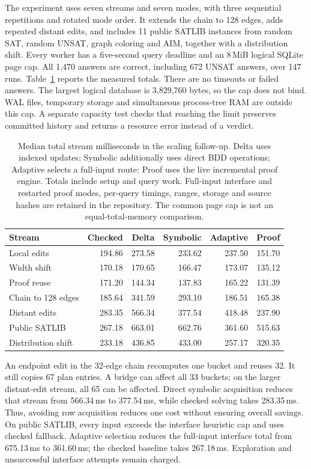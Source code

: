 \documentclass[11pt,a4paper]{article}
\numberwithin{equation}{section}
\theoremstyle{plain}
\theoremstyle{definition}
\theoremstyle{remark}
\begin{document}
The experiment uses seven streams and seven modes, with three sequential repetitions and rotated mode order. It extends the chain to 128 edges, adds repeated distant edits, and includes 11 public SATLIB instances from random SAT, random UNSAT, graph coloring and AIM, together with a distribution shift. Every worker has a five-second query deadline and an 8\,MiB logical SQLite page cap. All 1,470 answers are correct, including 672 UNSAT answers, over 147 runs. Table~\ref{tab:scaling-study} reports the measured totals. There are no timeouts or failed answers. The largest logical database is 3,829,760 bytes, so the cap does not bind. WAL files, temporary storage and simultaneous process-tree RAM are outside this cap. A separate capacity test checks that reaching the limit preserves committed history and returns a resource error instead of a verdict.

\begin{table}[b]
\centering
\small
\setlength{\tabcolsep}{5pt}
\begin{tabular}{lrrrrr}
\toprule
Stream & Checked & Delta & Symbolic & Adaptive & Proof \\
\midrule
Local edits & 194.86 & 273.58 & 233.62 & 237.50 & 151.70 \\
Width shift & 170.18 & 170.65 & 166.47 & 173.07 & 135.12 \\
Proof reuse & 171.20 & 144.34 & 137.83 & 165.22 & 131.39 \\
Chain to 128 edges & 185.64 & 341.59 & 293.10 & 186.51 & 165.38 \\
Distant edits & 283.35 & 566.34 & 377.54 & 418.48 & 237.90 \\
Public SATLIB & 267.18 & 663.01 & 662.76 & 361.60 & 515.63 \\
Distribution shift & 233.18 & 436.85 & 433.00 & 257.17 & 320.35 \\
\bottomrule
\end{tabular}
\caption{Median total stream milliseconds in the scaling follow-up. Delta uses indexed updates; Symbolic additionally uses direct BDD operations; Adaptive selects a full-input route; Proof uses the live incremental proof engine. Totals include setup and query work. Full-input interface and restarted proof modes, per-query timings, ranges, storage and source hashes are retained in the repository. The common page cap is not an equal-total-memory comparison.}
\label{tab:scaling-study}
\end{table}

An endpoint edit in the 32-edge chain recomputes one bucket and reuses 32. It still copies 67 plan entries. A bridge can affect all 33 buckets; on the larger distant-edit stream, all 65 can be affected. Direct symbolic acquisition reduces that stream from 566.34\,ms to 377.54\,ms, while checked solving takes 283.35\,ms. Thus, avoiding row acquisition reduces one cost without ensuring overall savings. On public SATLIB, every input exceeds the interface heuristic cap and uses checked fallback. Adaptive selection reduces the full-input interface total from 675.13\,ms to 361.60\,ms; the checked baseline takes 267.18\,ms. Exploration and unsuccessful interface attempts remain charged.
\end{document}
